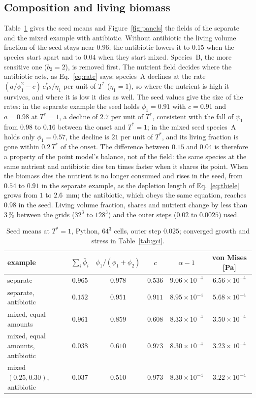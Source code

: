 \documentclass[11pt,a4paper]{article}
\newcommand{\lv}{\textstyle\sum_i\bar\phi_i}
\begin{document}
\subsection{Composition and living biomass}
\label{sec:composition}

Table~\ref{tab:examples} gives the seed means and Figure~\ref{fig:panels} the fields of the separate and the mixed example with antibiotic. Without antibiotic the living volume fraction of the seed stays near $0.96$; the antibiotic lowers it to $0.15$ when the species start apart and to $0.04$ when they start mixed. Species~B, the more sensitive one ($b_2=2$), is removed first. The nutrient field decides where the antibiotic acts, as Eq.~\eqref{eq:rate} says: species~A declines at the rate $(a/\phi_1^2-c)\,c^*_0s/\eta_1$ per unit of $T^*$ ($\eta_1=1$), so where the nutrient is high it survives, and where it is low it dies as well. The seed values give the size of the rates: in the separate example the seed holds $\phi_1=0.91$ with $c=0.91$ and $a=0.98$ at $T^*=1$, a decline of $2.7$ per unit of $T^*$, consistent with the fall of $\psi_1$ from $0.98$ to $0.16$ between the onset and $T^*=1$; in the mixed seed species~A holds only $\phi_1=0.57$, the decline is $21$ per unit of $T^*$, and its living fraction is gone within $0.2\,T^*$ of the onset. The difference between $0.15$ and $0.04$ is therefore a property of the point model's balance, not of the field: the same species at the same nutrient and antibiotic dies ten times faster when it shares its point. When the biomass dies the nutrient is no longer consumed and rises in the seed, from $0.54$ to $0.91$ in the separate example, as the depletion length of Eq.~\eqref{eq:thiele} grows from $1$ to $2.6$~mm; the antibiotic, which obeys the same equation, reaches $0.98$ in the seed. Living volume fraction, shares and nutrient change by less than $3\,\%$ between the grids ($32^3$ to $128^3$) and the outer steps ($0.02$ to $0.0025$) used.

\begin{table}[tbp]
  \centering
  \caption{Seed means at $T^*=1$, Python, $64^3$ cells, outer step $0.025$; converged growth and stress in Table~\ref{tab:gci}.}
  \label{tab:examples}
  \small
  \setlength{\tabcolsep}{4pt}
  \begin{tabular}{lccccc}
    \toprule
    example & $\lv$ & $\phi_1/(\phi_1+\phi_2)$ & $c$ & $\alpha-1$ & von Mises [Pa] \\
    \midrule
    separate & $0.965$ & $0.978$ & $0.536$ & $9.06\times10^{-4}$ & $6.56\times10^{-4}$ \\
    separate, antibiotic & $0.152$ & $0.951$ & $0.911$ & $8.95\times10^{-4}$ & $5.68\times10^{-4}$ \\
    mixed, equal amounts & $0.961$ & $0.859$ & $0.608$ & $8.33\times10^{-4}$ & $3.50\times10^{-4}$ \\
    mixed, equal amounts, antibiotic & $0.038$ & $0.610$ & $0.973$ & $8.30\times10^{-4}$ & $3.23\times10^{-4}$ \\
    mixed $(0.25,0.30)$, antibiotic & $0.037$ & $0.510$ & $0.973$ & $8.30\times10^{-4}$ & $3.22\times10^{-4}$ \\
    \bottomrule
  \end{tabular}
\end{table}
\end{document}
